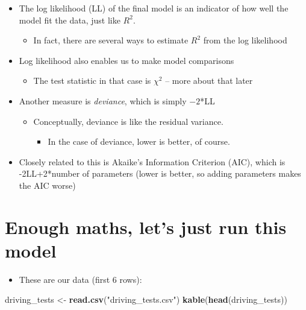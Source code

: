 \documentclass[]{article}
\newenvironment{Shaded}{}{}
\newcommand{\KeywordTok}[1]{\textcolor[rgb]{0.00,0.44,0.13}{\textbf{{#1}}}}
\newcommand{\StringTok}[1]{\textcolor[rgb]{0.25,0.44,0.63}{{#1}}}
\newcommand{\NormalTok}[1]{{#1}}
\begin{document}
\begin{itemize}
\itemsep1pt\parskip0pt
\item
  The log likelihood (LL) of the final model is an indicator of how well
  the model fit the data, just like $R^2$.

  \begin{itemize}
  \itemsep1pt\parskip0pt
  \item
    In fact, there are several ways to estimate $R^2$ from the log
    likelihood
  \end{itemize}
\item
  Log likelihood also enables us to make model comparisons

  \begin{itemize}
  \itemsep1pt\parskip0pt
  \item
    The test statistic in that case is $\chi^2$ -- more about that later
  \end{itemize}
\item
  Another measure is \emph{deviance}, which is simply $-2$*LL

  \begin{itemize}
  \itemsep1pt\parskip0pt
  \item
    Conceptually, deviance is like the residual variance.

    \begin{itemize}
    \itemsep1pt\parskip0pt
    \item
      In the case of deviance, lower is better, of course.
    \end{itemize}
  \end{itemize}
\item
  Closely related to this is Akaike's Information Criterion (AIC), which
  is -2LL+2*number of parameters (lower is better, so adding parameters
  makes the AIC worse)
\end{itemize}

\section{Enough maths, let's just run this
model}\label{enough-maths-lets-just-run-this-model}

\begin{itemize}
\itemsep1pt\parskip0pt
\item
  These are our data (first 6 rows):
\end{itemize}

\begin{Shaded}
\begin{Highlighting}[]
\NormalTok{driving_tests <-}\StringTok{ }\KeywordTok{read.csv}\NormalTok{(}\StringTok{"driving_tests.csv"}\NormalTok{)}
\KeywordTok{kable}\NormalTok{(}\KeywordTok{head}\NormalTok{(driving_tests))}
\end{Highlighting}
\end{Shaded}
\end{document}
